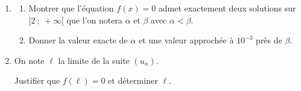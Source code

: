 	\begin{enumerate}
		\item \begin{enumerate}
			\item Montrer que l'équation $f(x)=0$ admet exactement deux solutions sur \linebreak $[2 ~;~+\infty[$ que l'on notera $\alpha$ et $\beta$ avec $\alpha<\beta$.

			\item Donner la valeur exacte de $\alpha$ et une valeur approchée à $10^{-3}$ près de $\beta$.
		\end{enumerate}

		\item On note $\ell$ la limite de la suite $(u_{n})$.

		Justifier que $f(\ell)=0$ et déterminer $\ell$.
	\end{enumerate}
